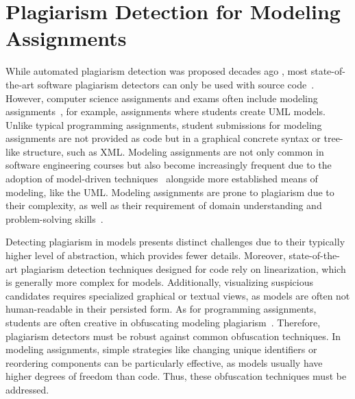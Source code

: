 \section{Plagiarism Detection for Modeling Assignments}

While automated plagiarism detection was proposed decades ago \cite{Ottenstein1976}, most state-of-the-art software plagiarism detectors can only be used with source code~\cite{MOSS, prechelt2002, Novak2020, Karnalim2019}.
%
However, computer science assignments and exams often include modeling assignments~\cite{Ciccozzi2018, Stahl2006, Saglam2023}, for example, assignments where students create \ac{UML} models. 
Unlike typical programming assignments, student submissions for modeling assignments are not provided as code but in a graphical concrete syntax or tree-like structure, such as \ac{XML}.
Modeling assignments are not only common in software engineering courses but also become increasingly frequent due to the adoption of model-driven techniques~\cite{Brambilla2017, Hutchinson2011} alongside more established means of modeling, like the \ac{UML}.
Modeling assignments are prone to plagiarism due to their complexity, as well as their requirement of domain understanding and problem-solving skills~\cite{Martinez2020}.

Detecting plagiarism in models presents distinct challenges due to their typically higher level of abstraction, which provides fewer details. Moreover, state-of-the-art plagiarism detection techniques designed for code rely on linearization, which is generally more complex for models. Additionally, visualizing suspicious candidates requires specialized graphical or textual views, as models are often not human-readable in their persisted form.
% 
As for programming assignments, students are often creative in obfuscating modeling plagiarism~\cite{Saglam2023}. 
Therefore, plagiarism detectors must be robust against common obfuscation techniques. In modeling assignments, simple strategies like changing unique identifiers or reordering components can be particularly effective, as models usually have higher degrees of freedom than code. Thus, these obfuscation techniques must be addressed.


